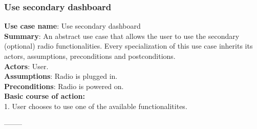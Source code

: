 \documentclass[11pt]{article}
\begin{document}
\subsubsection{Use secondary dashboard}
\textbf{Use case name}: Use secondary dashboard\\
\textbf{Summary}: An abstract use case that allows the user to use the secondary (optional) radio functionalities. Every specialization of this use case inherits its actors, assumptions, preconditions and postconditions.\\
\textbf{Actors}: User.\\
\textbf{Assumptions}: Radio is plugged in.\\
\textbf{Preconditions}: Radio is powered on.\\
\textbf{Basic course of action:}\\
\hspace*{10mm}1. User chooses to use one of the available functionalitites.
\begin{center}--------\end{center}
\end{document}
